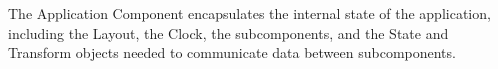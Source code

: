 %


The Application Component encapsulates the internal state of the
application, including the Layout, the Clock, the subcomponents,
and the State and Transform objects needed to communicate data
between subcomponents.


